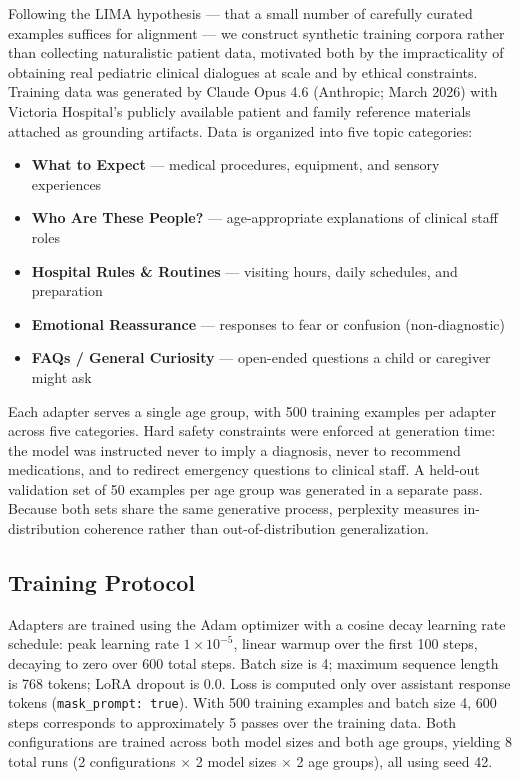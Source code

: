 \documentclass[journal]{IEEEtai}
\begin{document}
Following the LIMA hypothesis \cite{zhou2023lima} --- that a small number of carefully curated examples suffices for alignment --- we construct synthetic training corpora rather than collecting naturalistic patient data, motivated both by the impracticality of obtaining real pediatric clinical dialogues at scale and by ethical constraints. Training data was generated by Claude Opus 4.6 (Anthropic; March 2026) with Victoria Hospital's publicly available patient and family reference materials attached as grounding artifacts. Data is organized into five topic categories:

\begin{itemize}
    \item \textbf{What to Expect} --- medical procedures, equipment, and sensory experiences
    \item \textbf{Who Are These People?} --- age-appropriate explanations of clinical staff roles
    \item \textbf{Hospital Rules \& Routines} --- visiting hours, daily schedules, and preparation
    \item \textbf{Emotional Reassurance} --- responses to fear or confusion (non-diagnostic)
    \item \textbf{FAQs / General Curiosity} --- open-ended questions a child or caregiver might ask
\end{itemize}

Each adapter serves a single age group, with 500 training examples per adapter across five categories. Hard safety constraints were enforced at generation time: the model was instructed never to imply a diagnosis, never to recommend medications, and to redirect emergency questions to clinical staff. A held-out validation set of 50 examples per age group was generated in a separate pass. Because both sets share the same generative process, perplexity measures in-distribution coherence rather than out-of-distribution generalization.

\subsection{Training Protocol}

Adapters are trained using the Adam optimizer with a cosine decay learning rate schedule: peak learning rate $1 \times 10^{-5}$, linear warmup over the first 100 steps, decaying to zero over 600 total steps. Batch size is 4; maximum sequence length is 768 tokens; LoRA dropout is 0.0. Loss is computed only over assistant response tokens (\texttt{mask\_prompt: true}). With 500 training examples and batch size 4, 600 steps corresponds to approximately 5 passes over the training data. Both configurations are trained across both model sizes and both age groups, yielding 8 total runs (2 configurations $\times$ 2 model sizes $\times$ 2 age groups), all using seed 42.
\end{document}
